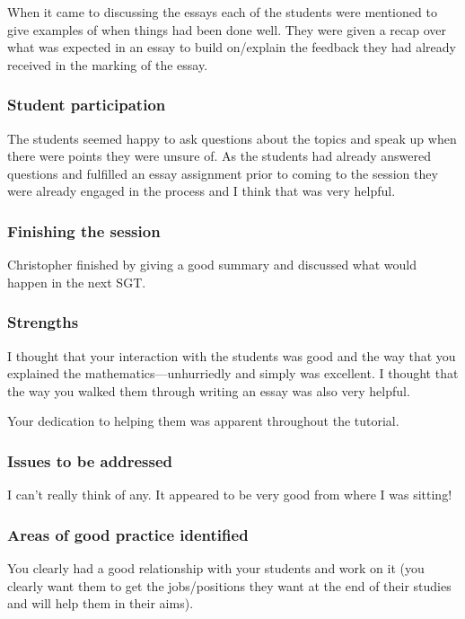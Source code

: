 When it came to discussing the essays each of the students were mentioned to give examples of when things had been done well. They were given a recap over what was expected in an essay to build on/explain the feedback they had already received in the marking of the essay.

\subsubsection{Student participation}\label{sec:A-participation}

The students seemed happy to ask questions about the topics and speak up when there were points they were unsure of. As the students had already answered questions and fulfilled an essay assignment prior to coming to the session they were already engaged in the process and I think that was very helpful.

\subsubsection{Finishing the session}\label{sec:A-finish}

Christopher finished by giving a good summary and discussed what would happen in the next SGT.

\subsubsection{Strengths}\label{sec:A-strengths}

I thought that your interaction with the students was good and the way that you explained the mathematics---unhurriedly and simply was excellent. I thought that the way you walked them through writing an essay was also very helpful.

Your dedication to helping them was apparent throughout the tutorial.

\subsubsection{Issues to be addressed}

I can't really think of any. It appeared to be very good from where I was sitting! 

\subsubsection{Areas of good practice identified}\label{sec:A-good}

You clearly had a good relationship with your students and work on it (you clearly want them to get the jobs/positions they want at the end of their studies and will help them in their aims). 


